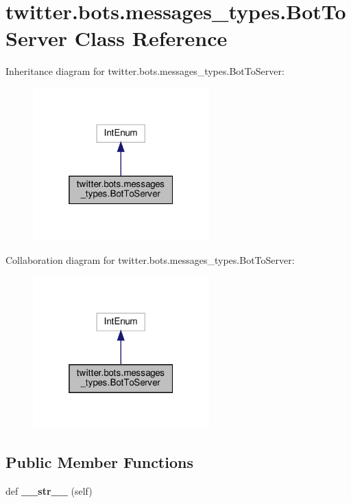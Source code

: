 \hypertarget{classtwitter_1_1bots_1_1messages__types_1_1BotToServer}{}\section{twitter.\+bots.\+messages\+\_\+types.\+Bot\+To\+Server Class Reference}
\label{classtwitter_1_1bots_1_1messages__types_1_1BotToServer}


Inheritance diagram for twitter.\+bots.\+messages\+\_\+types.\+Bot\+To\+Server\+:\nopagebreak
\begin{figure}[H]
\begin{center}
\leavevmode
\includegraphics[width=193pt]{classtwitter_1_1bots_1_1messages__types_1_1BotToServer__inherit__graph}
\end{center}
\end{figure}


Collaboration diagram for twitter.\+bots.\+messages\+\_\+types.\+Bot\+To\+Server\+:\nopagebreak
\begin{figure}[H]
\begin{center}
\leavevmode
\includegraphics[width=193pt]{classtwitter_1_1bots_1_1messages__types_1_1BotToServer__coll__graph}
\end{center}
\end{figure}
\subsection*{Public Member Functions}
\begin{DoxyCompactItemize}
\item 
\mbox{\label{classtwitter_1_1bots_1_1messages__types_1_1BotToServer_a915f4adbd233145618c2deec2c13e4eb}} 
def {\bfseries \+\_\+\+\_\+str\+\_\+\+\_\+} (self)
\end{DoxyCompactItemize}

